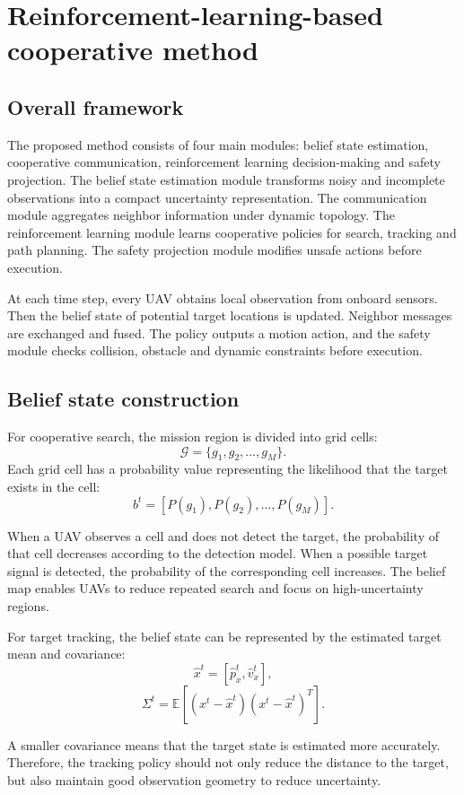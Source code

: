 \documentclass[14pt,a4paper]{extarticle}
\begin{document}
\section{Reinforcement-learning-based cooperative method}

\subsection{Overall framework}

The proposed method consists of four main modules: belief state estimation, cooperative communication, reinforcement learning decision-making and safety projection. The belief state estimation module transforms noisy and incomplete observations into a compact uncertainty representation. The communication module aggregates neighbor information under dynamic topology. The reinforcement learning module learns cooperative policies for search, tracking and path planning. The safety projection module modifies unsafe actions before execution.

At each time step, every UAV obtains local observation from onboard sensors. Then the belief state of potential target locations is updated. Neighbor messages are exchanged and fused. The policy outputs a motion action, and the safety module checks collision, obstacle and dynamic constraints before execution.

\subsection{Belief state construction}

For cooperative search, the mission region is divided into grid cells:
\[
\mathcal{G}=\{g_1,g_2,\ldots,g_M\}.
\]
Each grid cell has a probability value representing the likelihood that the target exists in the cell:
\[
b^t=[P(g_1),P(g_2),\ldots,P(g_M)].
\]

When a UAV observes a cell and does not detect the target, the probability of that cell decreases according to the detection model. When a possible target signal is detected, the probability of the corresponding cell increases. The belief map enables UAVs to reduce repeated search and focus on high-uncertainty regions.

For target tracking, the belief state can be represented by the estimated target mean and covariance:
\[
\hat{x}^t=[\hat{p}_x^t,\hat{v}_x^t],
\]
\[
\Sigma^t=\mathbb{E}[(x^t-\hat{x}^t)(x^t-\hat{x}^t)^T].
\]

A smaller covariance means that the target state is estimated more accurately. Therefore, the tracking policy should not only reduce the distance to the target, but also maintain good observation geometry to reduce uncertainty.
\end{document}

